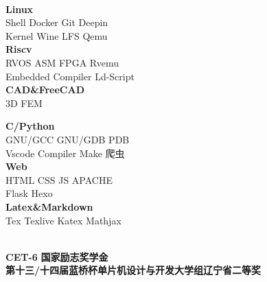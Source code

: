 \documentclass{ctexart}
\begin{document}
\begin{center}
    \hrulefill \\
    \begin{minipage}[t]{18em}
        \centering
        \textbf{Linux} \\
        Shell \quad Docker \quad Git \quad Deepin \\
        Kernel \quad Wine \quad LFS \quad Qemu \\
        
        \textbf{Riscv} \\
        RVOS \quad ASM \quad FPGA \quad Rvemu \\
        Embedded \quad Compiler \quad Ld-Script \\
        \textbf{CAD\&FreeCAD} \\
        3D \quad FEM \\
    \end{minipage}
    \quad 
    \begin{minipage}[t]{18em}
        \centering
        \textbf{C/Python} \\
        GNU/GCC \quad GNU/GDB \quad PDB \\
        Vscode \quad Compiler \quad Make \quad 爬虫\\
        \textbf{Web} \\
        HTML \quad CSS \quad JS \quad APACHE \\
        Flask \quad Hexo \\
        \textbf{Latex\&Markdown}\\
        Tex \quad Texlive \quad Katex \quad Mathjax \\
    \end{minipage}
    \quad
\end{center}

\begin{center}
    \hrulefill \\
    \textbullet \textbf{CET-6 } \qquad 
    \textbullet \textbf{国家励志奖学金}\\
    \textbullet \textbf{第十三/十四届蓝桥杯单片机设计与开发大学组辽宁省二等奖}
\end{center}
\end{document}
